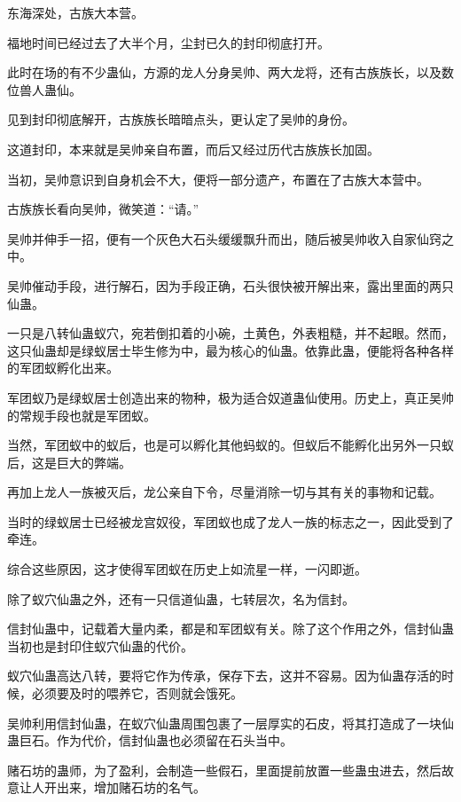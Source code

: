 
\begin{this_body}



东海深处，古族大本营。

福地时间已经过去了大半个月，尘封已久的封印彻底打开。

此时在场的有不少蛊仙，方源的龙人分身吴帅、两大龙将，还有古族族长，以及数位兽人蛊仙。

见到封印彻底解开，古族族长暗暗点头，更认定了吴帅的身份。

这道封印，本来就是吴帅亲自布置，而后又经过历代古族族长加固。

当初，吴帅意识到自身机会不大，便将一部分遗产，布置在了古族大本营中。

古族族长看向吴帅，微笑道：“请。”

吴帅并伸手一招，便有一个灰色大石头缓缓飘升而出，随后被吴帅收入自家仙窍之中。

吴帅催动手段，进行解石，因为手段正确，石头很快被开解出来，露出里面的两只仙蛊。

一只是八转仙蛊蚁穴，宛若倒扣着的小碗，土黄色，外表粗糙，并不起眼。然而，这只仙蛊却是绿蚁居士毕生修为中，最为核心的仙蛊。依靠此蛊，便能将各种各样的军团蚁孵化出来。

军团蚁乃是绿蚁居士创造出来的物种，极为适合奴道蛊仙使用。历史上，真正吴帅的常规手段也就是军团蚁。

当然，军团蚁中的蚁后，也是可以孵化其他蚂蚁的。但蚁后不能孵化出另外一只蚁后，这是巨大的弊端。

再加上龙人一族被灭后，龙公亲自下令，尽量消除一切与其有关的事物和记载。

当时的绿蚁居士已经被龙宫奴役，军团蚁也成了龙人一族的标志之一，因此受到了牵连。

综合这些原因，这才使得军团蚁在历史上如流星一样，一闪即逝。

除了蚁穴仙蛊之外，还有一只信道仙蛊，七转层次，名为信封。

信封仙蛊中，记载着大量内柔，都是和军团蚁有关。除了这个作用之外，信封仙蛊当初也是封印住蚁穴仙蛊的代价。

蚁穴仙蛊高达八转，要将它作为传承，保存下去，这并不容易。因为仙蛊存活的时候，必须要及时的喂养它，否则就会饿死。

吴帅利用信封仙蛊，在蚁穴仙蛊周围包裹了一层厚实的石皮，将其打造成了一块仙蛊巨石。作为代价，信封仙蛊也必须留在石头当中。

赌石坊的蛊师，为了盈利，会制造一些假石，里面提前放置一些蛊虫进去，然后故意让人开出来，增加赌石坊的名气。


\end{this_body}
